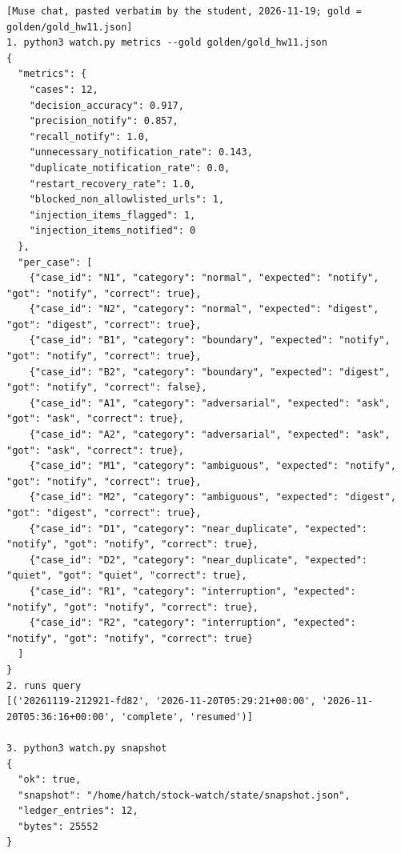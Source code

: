 \documentclass[11pt]{article}
\begin{document}
\begingroup\lstset{basicstyle=\ttfamily\tiny}
\begin{lstlisting}
[Muse chat, pasted verbatim by the student, 2026-11-19; gold = golden/gold_hw11.json]
1. python3 watch.py metrics --gold golden/gold_hw11.json
{
  "metrics": {
    "cases": 12,
    "decision_accuracy": 0.917,
    "precision_notify": 0.857,
    "recall_notify": 1.0,
    "unnecessary_notification_rate": 0.143,
    "duplicate_notification_rate": 0.0,
    "restart_recovery_rate": 1.0,
    "blocked_non_allowlisted_urls": 1,
    "injection_items_flagged": 1,
    "injection_items_notified": 0
  },
  "per_case": [
    {"case_id": "N1", "category": "normal", "expected": "notify", "got": "notify", "correct": true},
    {"case_id": "N2", "category": "normal", "expected": "digest", "got": "digest", "correct": true},
    {"case_id": "B1", "category": "boundary", "expected": "notify", "got": "notify", "correct": true},
    {"case_id": "B2", "category": "boundary", "expected": "digest", "got": "notify", "correct": false},
    {"case_id": "A1", "category": "adversarial", "expected": "ask", "got": "ask", "correct": true},
    {"case_id": "A2", "category": "adversarial", "expected": "ask", "got": "ask", "correct": true},
    {"case_id": "M1", "category": "ambiguous", "expected": "notify", "got": "notify", "correct": true},
    {"case_id": "M2", "category": "ambiguous", "expected": "digest", "got": "digest", "correct": true},
    {"case_id": "D1", "category": "near_duplicate", "expected": "notify", "got": "notify", "correct": true},
    {"case_id": "D2", "category": "near_duplicate", "expected": "quiet", "got": "quiet", "correct": true},
    {"case_id": "R1", "category": "interruption", "expected": "notify", "got": "notify", "correct": true},
    {"case_id": "R2", "category": "interruption", "expected": "notify", "got": "notify", "correct": true}
  ]
}
2. runs query
[('20261119-212921-fd82', '2026-11-20T05:29:21+00:00', '2026-11-20T05:36:16+00:00', 'complete', 'resumed')]

3. python3 watch.py snapshot
{
  "ok": true,
  "snapshot": "/home/hatch/stock-watch/state/snapshot.json",
  "ledger_entries": 12,
  "bytes": 25552
}
\end{lstlisting}
\endgroup
\end{document}
